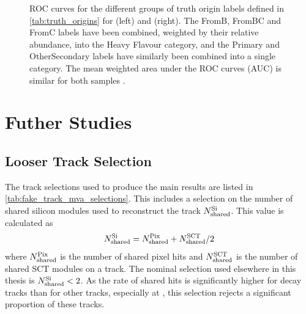 \begin{figure}[!htbp]
\begin{subfigure}[b]{0.48\textwidth}
    \end{subfigure}
    \caption{
        ROC curves for the different groups of truth origin labels defined in \cref{tab:truth_origins} for \ttbarjets (left) and \Zprimejets (right).
        The FromB, FromBC and FromC labels have been combined, weighted by their relative abundance, into the Heavy Flavour category, and the Primary and OtherSecondary labels have similarly been combined into a single category.
        The mean weighted area under the ROC curves (AUC) is similar for both samples \cite{ATL-PHYS-PUB-2022-027}.}
    \label{fig:track_origin_roc}
\end{figure}


\section{Futher Studies}\label{sec:gnn_trig_upgrade}



\subsection{Looser Track Selection}\label{sec:looser_track_selection}

The track selections used to produce the main results are listed in \cref{tab:fake_track_mva_selections}.
This includes a selection on the number of shared silicon modules used to reconstruct the track $N^{\textnormal{Si}}_{\textnormal{shared}}$.
This value is calculated as 
%
\begin{equation}
    N^{\textnormal{Si}}_{\textnormal{shared}} = 
    N^{\textnormal{Pix}}_{\textnormal{shared}} + N^{\textnormal{SCT}}_{\textnormal{shared}}/{2}
\end{equation}
%
where $N^{\textnormal{Pix}}_{\textnormal{shared}}$ is the number of shared pixel hits and $N^{\textnormal{SCT}}_{\textnormal{shared}}$ is the number of shared SCT modules on a track.
The nominal selection used elsewhere in this thesis is $N^{\textnormal{Si}}_{\textnormal{shared}} < 2$.
As the rate of shared hits is significantly higher for \bhadron decay tracks than for other tracks, especially at \highpt, this selection rejects a significant proportion of these tracks.

